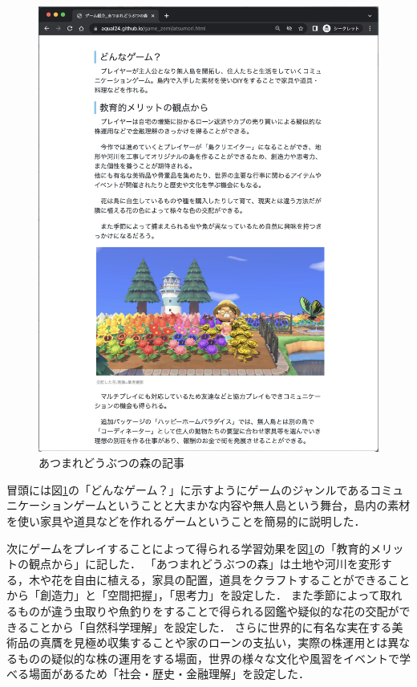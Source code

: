 \documentclass[12pt,a4j,titlepage]{ltjsarticle}
\begin{document}
\vspace{1zh}
\begin{figure}[H]
\begin{center}
 \includegraphics[keepaspectratio, scale=0.35]{PDF/あつ森1.pdf}
\end{center}
 \caption{あつまれどうぶつの森の記事}
 \label{fig:あつ森1}
\end{figure}



冒頭には図\ref{fig:あつ森1}の「どんなゲーム？」に示すようにゲームのジャンルであるコミュニケーションゲームということと大まかな内容や無人島という舞台，島内の素材を使い家具や道具などを作れるゲームということを簡易的に説明した．

次にゲームをプレイすることによって得られる学習効果を図\ref{fig:あつ森1}の「教育的メリットの観点から」に記した．
「あつまれどうぶつの森」は土地や河川を変形する，木や花を自由に植える，家具の配置，道具をクラフトすることができることから「創造力」と「空間把握」，「思考力」を設定した．
また季節によって取れるものが違う虫取りや魚釣りをすることで得られる図鑑や疑似的な花の交配ができることから「自然科学理解」を設定した．
さらに世界的に有名な実在する美術品の真贋を見極め収集することや家のローンの支払い，実際の株運用とは異なるものの疑似的な株の運用をする場面，世界の様々な文化や風習をイベントで学べる場面があるため「社会・歴史・金融理解」を設定した．
\end{document}
